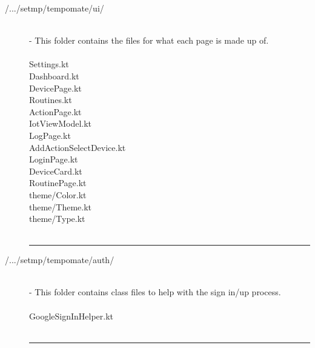 \begin{enumerate}[label=\alph*]
\begin{description}
              \item[/.../setmp/tempomate/ui/] \hfill \\
                    \small
                    - This folder contains the files for what each page is made up of.\\\\
                    \footnotesize
                    Settings.kt  \\
                    Dashboard.kt  \\
                    DevicePage.kt  \\
                    Routines.kt  \\
                    ActionPage.kt  \\
                    IotViewModel.kt  \\
                    LogPage.kt  \\
                    AddActionSelectDevice.kt  \\
                    LoginPage.kt  \\
                    DeviceCard.kt  \\
                    RoutinePage.kt  \\
                    theme/Color.kt  \\
                    theme/Theme.kt  \\
                    theme/Type.kt  \\\\

                    \vspace{-0.2cm}
                    \hrule
                    \vspace{0.2cm}

              \item[/.../setmp/tempomate/auth/] \hfill \\
                    \small
                    - This folder contains class files to help with the sign in/up process.\\\\
                    \footnotesize
                    GoogleSignInHelper.kt  \\\\

                    \vspace{-0.2cm}
                    \hrule
                    \vspace{0.2cm}


\end{description}
\end{enumerate}

